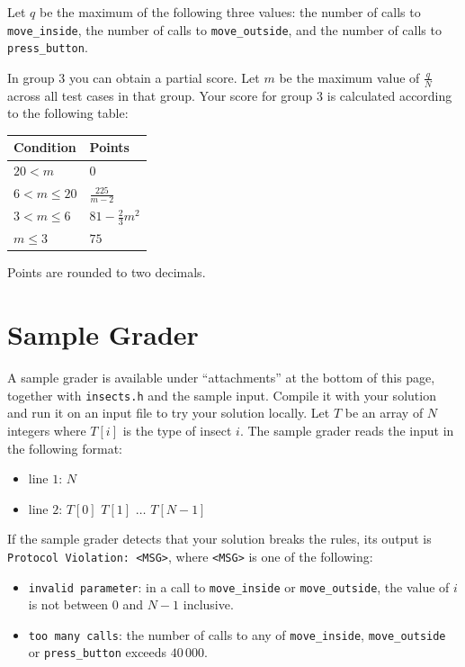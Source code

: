 \medskip
\noindent
Let $q$ be the maximum of the following three values: the number of calls to
\texttt{move\_inside}, the number of calls to \texttt{move\_outside}, and the number of calls to
\texttt{press\_button}.

In group $3$ you can obtain a partial score. Let $m$ be the maximum value of $\frac{q}{N}$ across all
test cases in that group. Your score for group $3$ is calculated according to the following table:

\begin{center}
\begin{tabular}{| l | l |}
  \hline
  \textbf{Condition} & \textbf{Points} \\ \hline
  $20 < m$          & $0$ \\ \hline
  $6 < m \leq 20$   & $\frac{225}{m-2}$ \\ \hline
  $3 < m \leq 6$    & $81 - \frac{2}{3} m^2$ \\ \hline
  $m \leq 3$        & $75$ \\ \hline
\end{tabular}
\end{center}

\noindent
Points are rounded to two decimals.

\section*{Sample Grader}
A sample grader is available under ``attachments'' at the bottom of this page, together with
\texttt{insects.h} and the sample input. Compile it with your solution and run it on an input file to
try your solution locally. Let $T$ be an array of $N$ integers where $T[i]$ is the type of insect
$i$. The sample grader reads the input in the following format:
\begin{itemize}
  \item line $1$: $N$
  \item line $2$: $T[0]$ $T[1]$ $\ldots$ $T[N-1]$
\end{itemize}

If the sample grader detects that your solution breaks the rules, its output is
\texttt{Protocol Violation: <MSG>}, where \texttt{<MSG>} is one of the following:
\begin{itemize}
  \item \texttt{invalid parameter}: in a call to \texttt{move\_inside} or \texttt{move\_outside}, the
  value of $i$ is not between $0$ and $N-1$ inclusive.
  \item \texttt{too many calls}: the number of calls to any of \texttt{move\_inside},
  \texttt{move\_outside} or \texttt{press\_button} exceeds $40\,000$.
\end{itemize}

